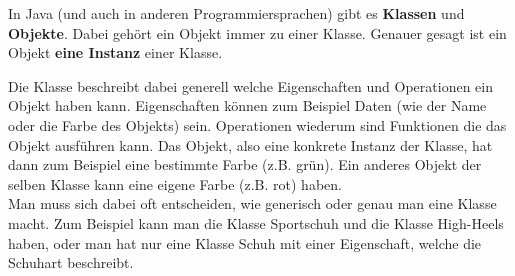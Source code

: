 


\begin{Infobox}
    In Java (und auch in anderen Programmiersprachen) gibt es \textbf{Klassen} und \textbf{Objekte}.
    Dabei gehört ein Objekt immer zu einer Klasse. Genauer gesagt ist ein Objekt \textbf{eine Instanz} einer Klasse.

    Die Klasse beschreibt dabei generell welche Eigenschaften und Operationen ein Objekt haben kann.
    Eigenschaften können zum Beispiel Daten (wie der Name oder die Farbe des Objekts) sein.
    Operationen wiederum sind Funktionen die das Objekt ausführen kann.
    Das Objekt, also eine konkrete Instanz der Klasse, hat dann zum Beispiel eine bestimmte Farbe (z.B. grün).
    Ein anderes Objekt der selben Klasse kann eine eigene Farbe (z.B. rot) haben.\\

    Man muss sich dabei oft entscheiden, wie generisch oder genau man eine Klasse macht. Zum Beispiel kann man die Klasse Sportschuh und die Klasse High-Heels haben, oder man hat nur eine Klasse Schuh mit einer Eigenschaft, welche die Schuhart beschreibt.
\end{Infobox}

